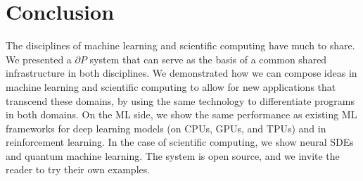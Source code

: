 \documentclass{juliacon}
\begin{document}
\begin{comment}
\begin{verbatim}
julia> guess = PointLight(Vec3(1.0), 20000.0, Vec3(1.0, 2.0, -7.0))

julia> function loss_function(light)
           rendered_color = raytrace(origin, direction, scene, light, eye_pos)
           rendered_img = process_image(rendered_color, screen_size.w,
                                        screen_size.h)
           return mean((rendered_img .- reference_img).^2)
       end

julia> gs = gradient(x -> loss_function(x, image), guess)   
\end{verbatim}

In our examples we have used our prototype renderer to demonstrate optimization of the position of a point light source, given the desired final rendered image. We define a loss function that accepts a point light source as input, renders the scene, and compares it to a reference image. As usual, gradients are then trivial and we can begin to update the position of the point source.

\begin{figure}[!htb]
\minipage{0.32\textwidth}
  \texttt{[image: images/triangle\_initial\_guess.jpg]}
  \caption{Initial Guess}\label{fig:raytracer1}
\endminipage\hfill
\minipage{0.32\textwidth}
  \texttt{[image: images/triangle\_100.jpg]}
  \caption{After 100 iterations}\label{fig:raytracer2}
\endminipage\hfill
\minipage{0.32\textwidth}%
  \texttt{[image: images/triangle\_original.jpg]}
  \caption{Target Image}\label{fig:raytracer3}
\endminipage
\end{figure}

\end{comment}


\section{Conclusion}

The disciplines of machine learning and scientific computing have much to share. We presented a $\partial P$ system that can serve as the basis of a common shared infrastructure in both disciplines. We demonstrated how we  can compose ideas in machine learning and scientific computing to allow for new applications that transcend these domains, by using the same technology to differentiate programs in both domains. On the ML side, we show the same performance as existing ML frameworks for deep learning models (on CPUs, GPUs, and TPUs) and in reinforcement learning. In the case of scientific computing, we show neural SDEs and quantum machine learning. The system is open source, and we invite the reader to try their own examples.
\end{document}
